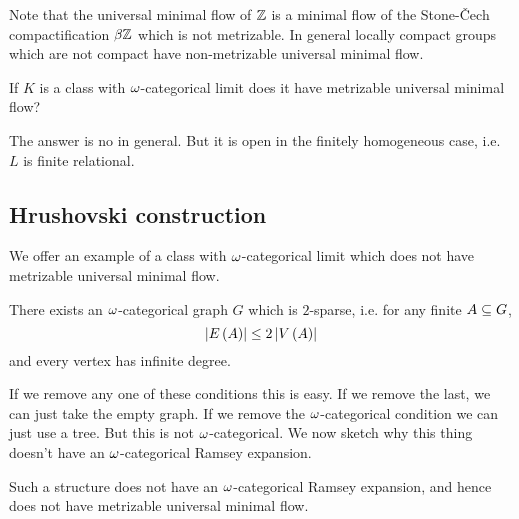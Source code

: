 \documentclass{amsart}
\begin{document}
Note that the universal minimal flow of $\mathbb{Z}$ 
is a minimal flow of the Stone-\v{C}ech compactification $\beta \mathbb{Z}$ which
is not metrizable.
In general locally compact groups which are not compact have non-metrizable universal
minimal flow.

\begin{qn}
If $K$ is a \Fraisse class with $\omega$-categorical limit does it have metrizable universal
minimal flow?
\end{qn}

The answer is no in general. But it is open in the finitely homogeneous case, i.e. $L$ is
finite relational.

\subsection{Hrushovski construction}

We offer an example of
a \Fraisse class with $\omega$-categorical limit which does not have metrizable universal
minimal flow.

\begin{thm}[Hrushovski]
There exists an $\omega$-categorical graph $G$ which is $2$-sparse, i.e. 
for any finite $A\subseteq G$, 
\begin{equation}
\left| E\left( A \right) \right|\leq 2 \left| V\left( A \right) \right|
\end{equation}
and every vertex has infinite degree.
\end{thm}

If we remove any one of these conditions this is easy. If we remove the last, we 
can just take the empty graph. 
If we remove the $\omega$-categorical condition we can just use a tree.
But this is not $\omega$-categorical.
We now sketch why this thing doesn't have an $\omega$-categorical Ramsey expansion.

\begin{thm}[Evans]
Such a structure does not have an $\omega$-categorical Ramsey expansion, and hence does not
have metrizable universal minimal flow.
\end{thm}
\end{document}
